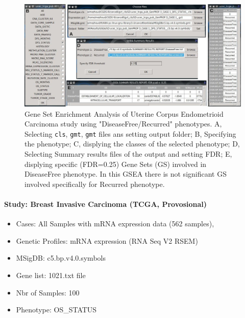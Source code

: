 \documentclass[a4paper]{article}
\begin{document}
\begin{figure}[!ht]
  \centering
 \includegraphics[scale=2]{image/GSEA-R.png}
 \caption{Gene Set Enrichment Analysis of Uterine Corpus Endometrioid Carcinoma study using "DiseaseFree/Recurred" phenotypes. A, Selecting \texttt{cls}, \texttt{gmt}, \texttt{gmt} files ans setting output folder; B, Specifying the phenotype; C, displying the classes of the selected phenotype; D, Selecting Summary results files of the output and setting FDR; E, displying specific (FDR=0.25) Gene Sets (GS) involved in DiseaseFree phenotype. In this GSEA there is not significant GS involved specifically for Recurred phenotype.}
 \label{figGSEA-R}
 \end{figure}
 
 
 
\paragraph{Study: Breast Invasive Carcinoma (TCGA, Provosional)}
\begin{itemize}
    \item Cases: All Samples with mRNA expression data (562 samples),
    \item Genetic Profiles: mRNA expression (RNA Seq V2 RSEM)
    \item MSigDB: c5.bp.v4.0.symbols
    \item Gene list: 1021.txt file
    \item Nbr of Samples: 100
    \item Phenotype: OS\_STATUS
 \end{itemize}
\end{document}
